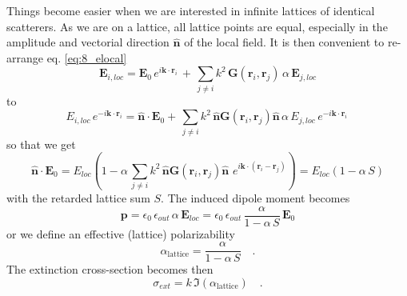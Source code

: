 Things become easier when we are interested in infinite lattices of identical scatterers. As we are on a lattice, all lattice points are equal, especially in the amplitude and vectorial direction $\mathbf{\hat{n}}$ of the local field. It is then 
 convenient to re-arrange eq. \ref{eq:8_elocal}
\begin{equation}
\mathbf{E}_{i, loc} =\mathbf{E}_{0} \, e^{i \mathbf{k} \cdot \mathbf{r}_i} \, +  \, 
 \sum_{j \neq i} k^2 \, 
\mathbf{G}(\mathbf{r}_i, \mathbf{r}_j) \,    \alpha \, \mathbf{E}_{j,loc}
\end{equation}
to
\begin{equation}
E_{i, loc}  \, e^{-i \mathbf{k} \cdot \mathbf{r}_i} =\mathbf{\hat{n}} \cdot \mathbf{E}_{0}  +  \, 
 \sum_{j \neq i} k^2 \, 
 \mathbf{\hat{n}} \mathbf{G}(\mathbf{r}_i, \mathbf{r}_j)  \mathbf{\hat{n}}\,    \alpha \, E_{j,loc} \, e^{-i \mathbf{k} \cdot \mathbf{r}_i} \,
\end{equation}
so that we get
\begin{equation}
\mathbf{\hat{n}} \cdot \mathbf{E}_{0} = 
E_{loc} \left( 1 -     \alpha  \,
 \sum_{j \neq i} k^2 \, 
 \mathbf{\hat{n}} \mathbf{G}(\mathbf{r}_i, \mathbf{r}_j)  \mathbf{\hat{n}}\,     \, e^{i \mathbf{k} \cdot ( \mathbf{r}_i - \mathbf{r}_j  ) } \right)
 = 
 {E}_{loc} \left( 1 -     \alpha  \, S \right)
\end{equation}
with the retarded lattice sum $S$. The induced
dipole moment becomes 
\begin{equation}
\mathbf{p} = \epsilon_0 \, \epsilon_{out} \, \alpha \, \mathbf{E}_{loc} =  \epsilon_0 \, \epsilon_{out} \, \frac{\alpha}{ 1 -     \alpha  \, S } \,
  \mathbf{E}_{0} 
\end{equation} 
or  we define an effective (lattice) polarizability
\begin{equation}
\alpha_\text{lattice} = \frac{\alpha}{ 1 -     \alpha  \, S }  \quad .
\end{equation} 
The extinction cross-section becomes then
\begin{equation}
\sigma_{ext} = k \, \Im(\alpha_\text{lattice})  \quad .
\end{equation}



\printbibliography[segment=\therefsegment,heading=subbibliography]




